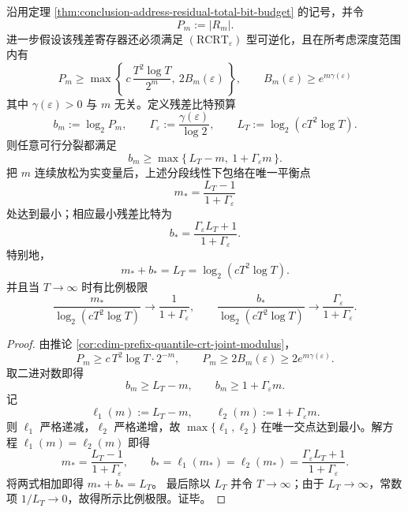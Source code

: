 \begin{theorem}[联合门槛下的最优预算分裂律]\label{thm:conclusion-address-residual-optimal-budget-splitting}
沿用定理 \ref{thm:conclusion-address-residual-total-bit-budget} 的记号，并令
\[
P_m:=|R_m|.
\]
进一步假设该残差寄存器还必须满足 \((\mathrm{RCRT}_{\varepsilon})\) 型可逆化，且在所考虑深度范围内有
\[
P_m\ge \max\!\left\{\,c\,\frac{T^2\log T}{2^m},\ 2B_m(\varepsilon)\,\right\},
\qquad
B_m(\varepsilon)\ge e^{m\gamma(\varepsilon)}
\]
其中 \(\gamma(\varepsilon)>0\) 与 \(m\) 无关。定义残差比特预算
\[
b_m:=\log_2 P_m,
\qquad
\Gamma_{\varepsilon}:=\frac{\gamma(\varepsilon)}{\log 2},
\qquad
L_T:=\log_2(cT^2\log T).
\]
则任意可行分裂都满足
\[
\boxed{\;
b_m\ge \max\bigl\{\,L_T-m,\ 1+\Gamma_{\varepsilon}m\,\bigr\}.\;}
\]
把 \(m\) 连续放松为实变量后，上述分段线性下包络在唯一平衡点
\[
\boxed{\;
m_{\ast}=\frac{L_T-1}{1+\Gamma_{\varepsilon}}\;}
\]
处达到最小；相应最小残差比特为
\[
\boxed{\;
b_{\ast}=\frac{\Gamma_{\varepsilon}L_T+1}{1+\Gamma_{\varepsilon}}.\;}
\]
特别地，
\[
m_{\ast}+b_{\ast}=L_T=\log_2(cT^2\log T).
\]
并且当 \(T\to\infty\) 时有比例极限
\[
\boxed{\;
\frac{m_{\ast}}{\log_2(cT^2\log T)}\to \frac{1}{1+\Gamma_{\varepsilon}},
\qquad
\frac{b_{\ast}}{\log_2(cT^2\log T)}\to \frac{\Gamma_{\varepsilon}}{1+\Gamma_{\varepsilon}}.\;}
\]
\end{theorem}
\begin{proof}
由推论 \ref{cor:cdim-prefix-quantile-crt-joint-modulus}，
\[
P_m\ge c\,T^2\log T\cdot 2^{-m},
\qquad
P_m\ge 2B_m(\varepsilon)\ge 2e^{m\gamma(\varepsilon)}.
\]
取二进对数即得
\[
b_m\ge L_T-m,
\qquad
b_m\ge 1+\Gamma_{\varepsilon}m.
\]
记
\[
\ell_1(m):=L_T-m,
\qquad
\ell_2(m):=1+\Gamma_{\varepsilon}m.
\]
则 \(\ell_1\) 严格递减，\(\ell_2\) 严格递增，故 \(\max\{\ell_1,\ell_2\}\) 在唯一交点达到最小。解方程
\(
\ell_1(m)=\ell_2(m)
\)
即得
\[
m_{\ast}=\frac{L_T-1}{1+\Gamma_{\varepsilon}},
\qquad
b_{\ast}=\ell_1(m_{\ast})=\ell_2(m_{\ast})=\frac{\Gamma_{\varepsilon}L_T+1}{1+\Gamma_{\varepsilon}}.
\]
将两式相加即得 \(m_{\ast}+b_{\ast}=L_T\)。
最后除以 \(L_T\) 并令 \(T\to\infty\)；由于 \(L_T\to\infty\)，常数项 \(1/L_T\to 0\)，故得所示比例极限。证毕。
\end{proof}

